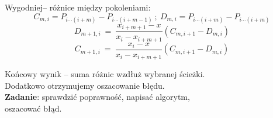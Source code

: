 \begin{frame}


Wygodniej-- różnice między pokoleniami:
$$
C_{m,i}=P_{i\cdots(i+m)}-P_{i\cdots(i+m-1)}\ ;\ D_{m,i}=P_{i\cdots(i+m)}-P_{i\cdots(i+m)}
$$
$$
D_{m+1,i}\ =\ \frac{x_{i+m+1}-x}{x_{i}-x_{i+m+1}}(C_{m,i+1}-D_{m,i})
$$
$$
C_{m+1,i}\ =\ \frac{x_{i}-x}{x_{i}-x_{i+m+1}}(C_{m,i+1}-D_{m,i})
$$
\vspace{3mm}

Końcowy wynik -- suma różnic wzdłuż wybranej ścieżki. \\
Dodatkowo otrzymujemy oszacowanie błędu. \\
\vspace{3mm}
\textbf{Zadanie}: sprawdzić poprawność, napisać algorytm, \\
oszacować błąd.
\end{frame}
